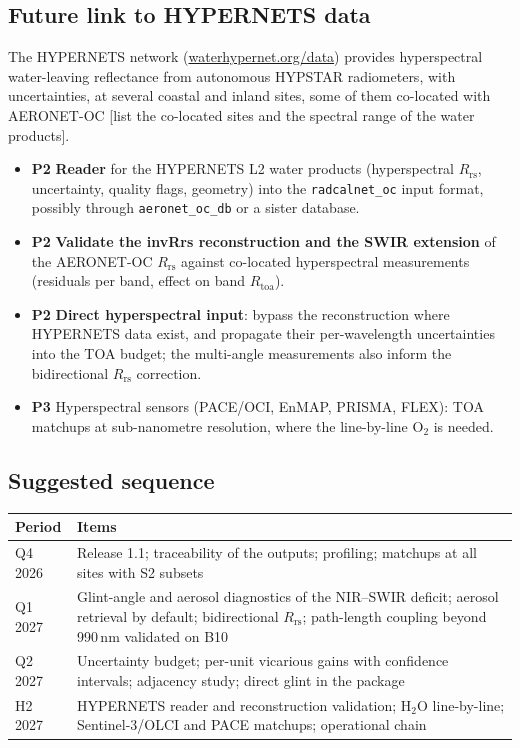 \documentclass[11pt,a4paper]{article}
\newcommand{\Rtoa}{R_\mathrm{toa}}
\newcommand{\Rrs}{R_\mathrm{rs}}
\newcommand{\code}[1]{\texttt{#1}}
\newcommand{\todo}[1]{\textcolor{red!70!black}{[#1]}}
\newcommand{\prio}[1]{\textbf{\textcolor{blue!50!black}{#1}}}
\begin{document}
\subsection{Future link to HYPERNETS data}
The HYPERNETS network (\href{https://waterhypernet.org/data/}{waterhypernet.org/data}) provides hyperspectral
water-leaving reflectance from autonomous HYPSTAR radiometers, with uncertainties, at several coastal and inland
sites, some of them co-located with AERONET-OC \todo{list the co-located sites and the spectral range of the
water products}.
\begin{itemize}
\item \prio{P2} \textbf{Reader} for the HYPERNETS L2 water products (hyperspectral $\Rrs$, uncertainty, quality flags,
  geometry) into the \code{radcalnet\_oc} input format, possibly through \code{aeronet\_oc\_db} or a sister
  database.
\item \prio{P2} \textbf{Validate the invRrs reconstruction and the SWIR extension} of the AERONET-OC $\Rrs$ against
  co-located hyperspectral measurements (residuals per band, effect on band $\Rtoa$).
\item \prio{P2} \textbf{Direct hyperspectral input}: bypass the reconstruction where HYPERNETS data exist, and
  propagate their per-wavelength uncertainties into the TOA budget; the multi-angle measurements also inform the
  bidirectional $\Rrs$ correction.
\item \prio{P3} Hyperspectral sensors (PACE/OCI, EnMAP, PRISMA, FLEX): TOA matchups at sub-nanometre resolution,
  where the line-by-line O$_2$ is needed.
\end{itemize}

\subsection{Suggested sequence}
\begin{table}[h]
\centering\small
\begin{tabularx}{\textwidth}{lX}
\toprule
Period & Items \\
\midrule
Q4 2026 & Release 1.1; traceability of the outputs; profiling; matchups at all sites with S2 subsets \\
Q1 2027 & Glint-angle and aerosol diagnostics of the NIR--SWIR deficit; aerosol retrieval by default;
          bidirectional $\Rrs$; path-length coupling beyond 990\,nm validated on B10 \\
Q2 2027 & Uncertainty budget; per-unit vicarious gains with confidence intervals; adjacency study;
          direct glint in the package \\
H2 2027 & HYPERNETS reader and reconstruction validation; H$_2$O line-by-line; Sentinel-3/OLCI and PACE matchups;
          operational chain \\
\bottomrule
\end{tabularx}
\end{table}
\end{document}
